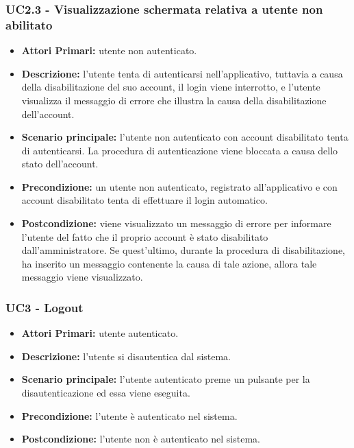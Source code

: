\subsubsection{ UC2.3 - Visualizzazione schermata relativa a utente non abilitato}
\begin{itemize}
           	\item\textbf{Attori Primari:} utente non autenticato.
           	\item\textbf{Descrizione:} l'utente tenta di autenticarsi nell'applicativo, tuttavia a causa della disabilitazione del suo account, il login viene interrotto, e
           	l'utente visualizza il messaggio di errore che illustra la causa della disabilitazione dell'account.
           	\item\textbf{Scenario principale:} l’utente non autenticato con account disabilitato tenta di autenticarsi. 
           	La procedura di autenticazione viene bloccata a causa dello stato dell'account.
           	\item\textbf{Precondizione:} un utente non autenticato, registrato all'applicativo e con account disabilitato tenta di effettuare il login automatico. 
           	\item\textbf{Postcondizione:} viene visualizzato un messaggio di errore per informare l'utente del fatto che il 
           	proprio account è stato disabilitato dall'amministratore. Se quest'ultimo, durante la procedura di disabilitazione, ha inserito un messaggio contenente la causa di tale azione, allora tale messaggio viene visualizzato.
\end{itemize}

\subsubsection{ UC3 - Logout}
\begin{itemize}
	\item\textbf{Attori Primari:} 
	utente autenticato.
	\item\textbf{Descrizione:} 
	l'utente si disautentica dal sistema.
	\item\textbf{Scenario principale:} 
	l'utente autenticato preme un pulsante per la disautenticazione ed essa viene eseguita.
	\item\textbf{Precondizione:} 
	l'utente è autenticato nel sistema.
	\item\textbf{Postcondizione:}
	l'utente non è autenticato nel sistema.
\end{itemize}

